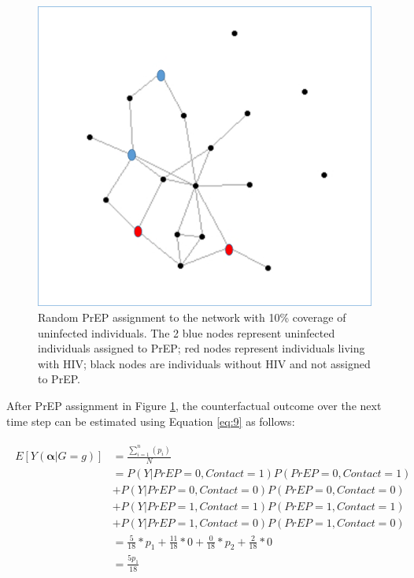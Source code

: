 \documentclass{article}
\theoremstyle{definition}
\begin{document}
\begin{figure}[H]
    \centering
    \includegraphics[scale=0.5]{Original Figures/Network Example 2.png}
    \caption{Random PrEP assignment to the network with 10\% coverage of uninfected individuals. The 2 blue nodes represent uninfected individuals assigned to PrEP; red nodes represent individuals living with HIV; black nodes are individuals without HIV and not assigned to PrEP.}
    \label{fig: Figure 3}
\end{figure}

After PrEP assignment in Figure \ref{fig: Figure 3}, the counterfactual outcome over the next time step can be estimated using Equation \ref{eq:9} as follows:

\begin{align}
\begin{split}
E[Y\left(\mathbf{\alpha}|G=g\right)] & = \frac{\sum_{i=1}^{n}(p_{i})}{N}  \\ 
& = P\left(Y|PrEP = 0, Contact = 1\right)P\left(PrEP = 0, Contact = 1\right)  \\ \nonumber
& +P\left(Y|PrEP = 0, Contact = 0\right)P\left(PrEP = 0, Contact = 0\right)  \\ \nonumber
& +P\left(Y|PrEP = 1, Contact = 1\right)P\left(PrEP = 1, Contact = 1\right) \\ \nonumber
&  +P\left(Y|PrEP = 1, Contact = 0\right)P\left(PrEP = 1, Contact = 0\right) \\ \nonumber
 &=  \frac{5}{18}*p_1 +  \frac{11}{18}*0 +\frac{0}{18}*p_2 +  \frac{2}{18}*0 \\ \nonumber
 &=\frac{5p_1}{18}  \nonumber
\end{split}
\end{align}
\end{document}
